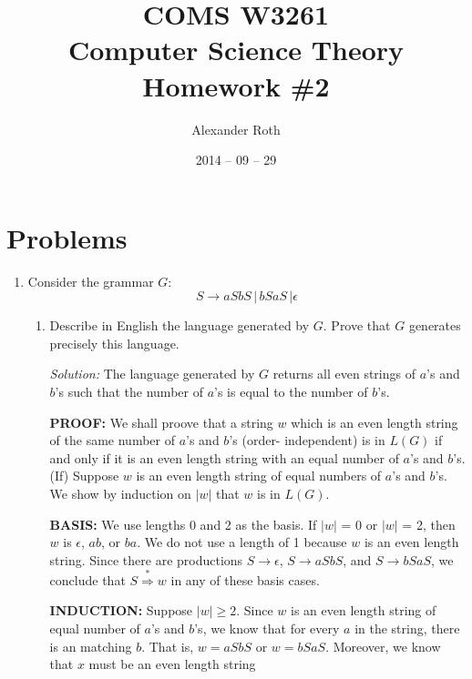 \documentclass[]{article}
\begin{document}
\newtheorem{thm}{Theorem}
\title{COMS W3261 \\ Computer Science Theory \\ Homework                                                              \#2                           }
\author{Alexander Roth}
\date{2014 -- 09 -- 29}
\maketitle

\section*{Problems}
  \begin{enumerate}
    \item Consider the grammar $G$:
      \[ S \rightarrow a S b S \, | \, b S a S \, | \epsilon \]
      \begin{enumerate}
        \item Describe in English the language generated by $G$. Prove that $G$
        generates precisely this language.
        \item[\emph{Solution:}]
          The language generated by $G$ returns all even strings of $a$'s and
          $b$'s such that the number of $a$'s is equal to the number of $b$'s.
        \item[\textbf{PROOF:}] We shall proove that a string $w$ which is an
        even length string of the same number of $a$'s and $b$'s (order-
        independent) is in $L(G)$ if and only if it is an even length string
        with an equal number of $a$'s  and $b$'s. \\
        (If) Suppose $w$ is an even length string of equal numbers of $a$'s and
        $b$'s. We show by induction on $|w|$ that $w$ is in $L(G)$.
        \item[\textbf{BASIS:}] We use lengths 0 and 2 as the basis. If $|w|$ =
        0 or $|w|$ = 2, then $w$ is $\epsilon$, $ab$, or $ba$. We do not use a
        length of 1 because $w$ is an even length string. Since there
        are productions $S \rightarrow \epsilon$, $S \rightarrow aSbS$, and $S
        \rightarrow bSaS$, we conclude that $S \overset{*}{\Rightarrow} w$ in
        any of these basis cases.
        \item[\textbf{INDUCTION:}] Suppose $|w| \geq 2$. Since $w$ is an even
        length string of equal number of $a$'s and $b$'s, we know that for
        every $a$ in the string, there is an matching $b$. That is, $w = aSbS$
        or $w = bSaS$. Moreover, we know that $x$ must be an even length string

\end{enumerate}
\end{enumerate}
\end{document}
